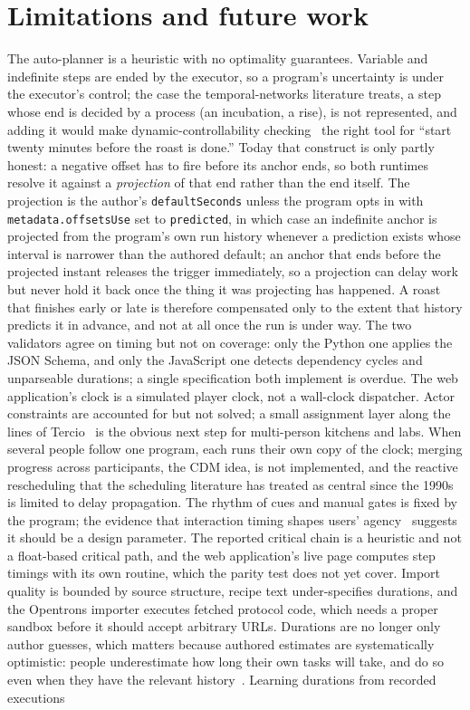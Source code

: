 \documentclass[10pt]{article}
\newcommand{\code}[1]{\texttt{#1}}
\begin{document}
\section{Limitations and future work}
\label{sec:limits}

The auto-planner is a heuristic with no optimality guarantees. Variable and indefinite steps are ended by the executor, so a program's uncertainty is under the executor's control; the case the temporal-networks literature treats, a step whose end is decided by a process (an incubation, a rise), is not represented, and adding it would make dynamic-controllability checking~\cite{morris2001dc} the right tool for ``start twenty minutes before the roast is done.'' Today that construct is only partly honest: a negative offset has to fire before its anchor ends, so both runtimes resolve it against a \emph{projection} of that end rather than the end itself. The projection is the author's \code{defaultSeconds} unless the program opts in with \code{metadata.offsetsUse} set to \code{predicted}, in which case an indefinite anchor is projected from the program's own run history whenever a prediction exists whose interval is narrower than the authored default; an anchor that ends before the projected instant releases the trigger immediately, so a projection can delay work but never hold it back once the thing it was projecting has happened. A roast that finishes early or late is therefore compensated only to the extent that history predicts it in advance, and not at all once the run is under way. The two validators agree on timing but not on coverage: only the Python one applies the JSON Schema, and only the JavaScript one detects dependency cycles and unparseable durations; a single specification both implement is overdue. The web application's clock is a simulated player clock, not a wall-clock dispatcher. Actor constraints are accounted for but not solved; a small assignment layer along the lines of Tercio~\cite{gombolay2018tercio} is the obvious next step for multi-person kitchens and labs. When several people follow one program, each runs their own copy of the clock; merging progress across participants, the CDM idea, is not implemented, and the reactive rescheduling that the scheduling literature has treated as central since the 1990s~\cite{kelleher1997rescheduling} is limited to delay propagation. The rhythm of cues and manual gates is fixed by the program; the evidence that interaction timing shapes users' agency~\cite{yu2017timing} suggests it should be a design parameter. The reported critical chain is a heuristic and not a float-based critical path, and the web application's live page computes step timings with its own routine, which the parity test does not yet cover. Import quality is bounded by source structure, recipe text under-specifies durations, and the Opentrons importer executes fetched protocol code, which needs a proper sandbox before it should accept arbitrary URLs. Durations are no longer only author guesses, which matters because authored estimates are systematically optimistic: people underestimate how long their own tasks will take, and do so even when they have the relevant history~\cite{buehler1994planning,kahneman1979intuitive}. Learning durations from recorded executions 
\end{document}
